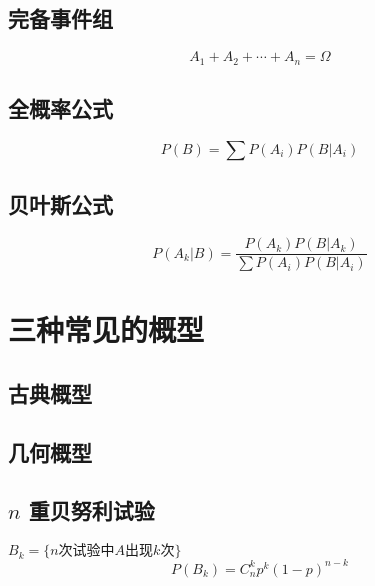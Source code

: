 \subsection{完备事件组}
\label{sub:完备事件组}

\[
	A_1 + A_2 + \cdots + A_n = \Omega
\]

\subsection{全概率公式}
\label{sub:全概率公式}

\[
	P(B) = \sum P(A_i) P(B | A_i)
\]

\subsection{贝叶斯公式}
\label{sub:贝叶斯公式}

\[
	P(A_k | B ) = \frac{P(A_k) P(B | A_k)}{\sum P(A_i) P(B | A_i)}
\]

\section{三种常见的概型}
\label{sec:三种常见的概型}

\subsection{古典概型}
\label{sub:古典概型}

\subsection{几何概型}
\label{sub:几何概型}

\subsection{$n$ 重贝努利试验}
\label{sub:n_重贝努利试验}

$B_k= \{ n \text{次试验中}A \text{出现}k\text{次} \}$
\[
	P(B_k) = C_n^k p^k (1-p)^{n-k}
\]
